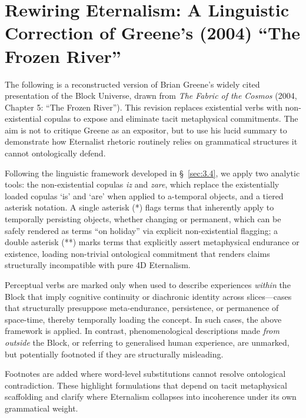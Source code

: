 \documentclass[12pt]{book}
\begin{document}
\appendix

\chapter[Rewiring the Language of Eternalism]{Rewiring Eternalism: A Linguistic Correction of Greene's (2004) ``The Frozen River''}\label{sec:appendix:greene}

The following is a reconstructed version of Brian Greene's widely cited presentation of the Block Universe, drawn from \textit{The Fabric of the Cosmos} (2004, Chapter 5: ``The Frozen River''). This revision replaces existential verbs with non-existential copulas to expose and eliminate tacit metaphysical commitments. The aim is not to critique Greene as an expositor, but to use his lucid summary to demonstrate how Eternalist rhetoric routinely relies on grammatical structures it cannot ontologically defend.

Following the linguistic framework developed in \S~\ref{sec:3.4}, we apply two analytic tools: the non-existential copulas \textit{iz} and \textit{zare}, which replace the existentially loaded copulas `is' and `are' when applied to a-temporal objects, and a tiered asterisk notation. A single asterisk (*) flags terms that inherently apply to temporally persisting objects, whether changing or permanent, which can be safely rendered as terms ``on holiday'' via explicit non-existential flagging; a double asterisk (**) marks terms that explicitly assert metaphysical endurance or existence, loading non-trivial ontological commitment that renders claims structurally incompatible with pure 4D Eternalism.

Perceptual verbs are marked only when used to describe experiences \textit{within} the Block that imply cognitive continuity or diachronic identity across slices---cases that structurally presuppose meta-endurance, persistence, or permanence of space-time, thereby temporally loading the concept. In such cases, the above framework is applied. In contrast, phenomenological descriptions made \textit{from outside} the Block, or referring to generalised human experience, are unmarked, but potentially footnoted if they are structurally misleading.

Footnotes are added where word-level substitutions cannot resolve ontological contradiction. These highlight formulations that depend on tacit metaphysical scaffolding and clarify where Eternalism collapses into incoherence under its own grammatical weight.\\
\vspace{0.1pt}\hrulefill\\
\end{document}
